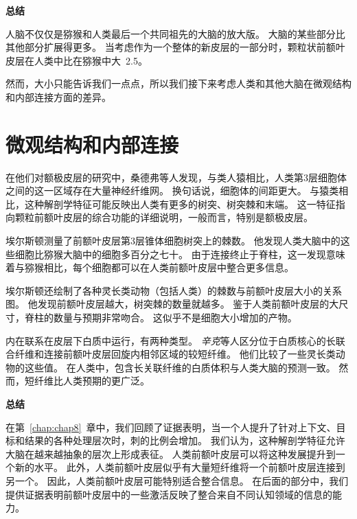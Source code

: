 \textbf{总结}
\par

人脑不仅仅是猕猴和人类最后一个共同祖先的大脑的放大版。
大脑的某些部分比其他部分扩展得更多。
当考虑作为一个整体的新皮层的一部分时，颗粒状前额叶皮层在人类中比在猕猴中大~2.5。
\par


然而，大小只能告诉我们一点点，所以我们接下来考虑人类和其他大脑在微观结构和内部连接方面的差异。



\section{微观结构和内部连接}

在他们对额极皮层的研究中，桑德弗等人\cite{semendeferi2011spatial}发现，与类人猿相比，人类第3层细胞体之间的这一区域存在大量神经纤维网。
换句话说，细胞体的间距更大。
与猿类相比，这种解剖学特征可能反映出人类有更多的树突、树突棘和末端。
这一特征指向颗粒前额叶皮层的综合功能的详细说明，一般而言，特别是额极皮层。
\par


埃尔斯顿\cite{elston2001pyramidal}测量了前额叶皮层第3层锥体细胞树突上的棘数。
他发现人类大脑中的这些细胞比猕猴大脑中的细胞多百分之七十。
由于连接终止于脊柱，这一发现意味着与猕猴相比，每个细胞都可以在人类前额叶皮层中整合更多信息。
\par


埃尔斯顿\cite{elston2007specialization}还绘制了各种灵长类动物（包括人类）的棘数与前额叶皮层大小的关系图。
他发现前额叶皮层越大，树突棘的数量就越多。
鉴于人类前额叶皮层的大尺寸，脊柱的数量与预期非常吻合。
这似乎不是细胞大小增加的产物。
\par


内在联系在皮层下白质中运行，有两种类型。
\textit{辛克}等人\cite{schenker2005neural}区分位于白质核心的长联合纤维和连接前额叶皮层回旋内相邻区域的较短纤维。
他们比较了一些灵长类动物的这些值。
在人类中，包含长关联纤维的白质体积与人类大脑的预测一致。
然而，短纤维比人类预期的更广泛。
\par



\textbf{总结}
\par

在第~\ref{chap:chap8}~章中，我们回顾了证据表明，当一个人提升了针对上下文、目标和结果的各种处理层次时，刺的比例会增加。
我们认为，这种解剖学特征允许大脑在越来越抽象的层次上形成表征。
人类前额叶皮层可以将这种发展提升到一个新的水平。
此外，人类前额叶皮层似乎有大量短纤维将一个前额叶皮层连接到另一个。
因此，人类前额叶皮层可能特别适合整合信息。
在后面的部分中，我们提供证据表明前额叶皮层中的一些激活反映了整合来自不同认知领域的信息的能力。



